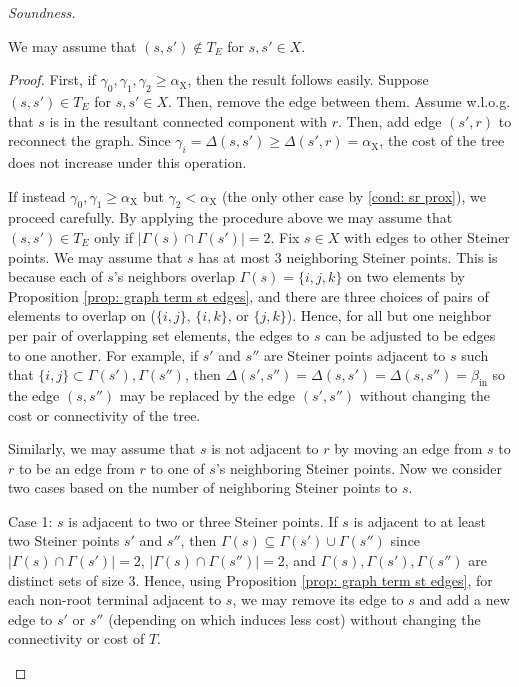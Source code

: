 \documentclass{article}\providecommand{\DeclareRedundantLanguages}[2]{}\usepackage[a4paper,margin=20mm]{geometry}
\newcommand{\1}{\textbf{1}}
\newcommand{\srd}{\alpha_{\text{X}}}
\begin{document}
\begin{paragraph}{\textit{Soundness.}}
 
 
 \begin{lemma} \label{lem: graph st to st}
 We may assume that $(s, s') \not\in T_E$ for $s, s' \in X$.
 \end{lemma}
 \begin{proof}
  First, if $\gamma_0, \gamma_1, \gamma_2 \geq \srd$, then the result follows easily. Suppose $(s,s') \in T_E$ for $s, s' \in X$. Then, remove the edge between them. Assume w.l.o.g. that $s$ is in the resultant connected component with $r$. Then, add edge $(s', r)$ to reconnect the graph. Since $\gamma_i = \Delta(s,s') \geq \Delta(s', r) = \srd$, the cost of the tree does not increase under this operation.
  
  If instead $\gamma_0, \gamma_1 \geq \srd$ but $\gamma_2 < \srd$ (the only other case by \ref{cond: sr prox}), we proceed carefully. By applying the procedure above we may assume that $(s,s') \in T_E$ only if $|\Gamma(s) \cap \Gamma(s')| = 2$. Fix $s \in X$ with edges to other Steiner points. We may assume that $s$ has at most $3$ neighboring Steiner points. This is because each of $s$'s neighbors overlap $\Gamma(s) = \{i,j,k\}$ on two elements by Proposition \ref{prop: graph term st edges}, and there are three choices of pairs of elements to overlap on ($\{i,j\}$, $\{i,k\}$, or $\{j,k\}$). Hence, for all but one neighbor per pair of overlapping set elements, the edges to $s$ can be adjusted to be edges to one another. For example, if $s'$ and $s''$ are Steiner points adjacent to $s$ such that $\{i,j\} \subset \Gamma(s'), \Gamma(s'')$, then $\Delta(s', s'') = \Delta(s, s') = \Delta(s, s'') = \beta_{\text{in}}$ so the edge $(s, s'')$ may be replaced by the edge $(s', s'')$ without changing the cost or connectivity of the tree.
  
  Similarly, we may assume that $s$ is not adjacent to $r$ by moving an edge from $s$ to $r$ to be an edge from $r$ to one of $s$'s neighboring Steiner points. Now we consider two cases based on the number of neighboring Steiner points to $s$.
  
  
  \begin{paragraph}{Case 1: $s$ is adjacent to two or three Steiner points.}
  If $s$ is adjacent to at least two Steiner points $s'$ and $s''$, then $\Gamma(s) \subseteq \Gamma(s') \cup \Gamma(s'')$ since $|\Gamma(s) \cap \Gamma(s')| = 2$, $|\Gamma(s) \cap \Gamma(s'')| = 2$, and $\Gamma(s),\Gamma(s'),\Gamma(s'')$ are distinct sets of size $3$. Hence, using Proposition \ref{prop: graph term st edges}, for each non-root terminal adjacent to $s$, we may remove its edge to $s$ and add a new edge to $s'$ or $s''$ (depending on which induces less cost) without changing the connectivity or cost of $T$.
  

\end{paragraph}
\end{proof}
\end{paragraph}
\end{document}
